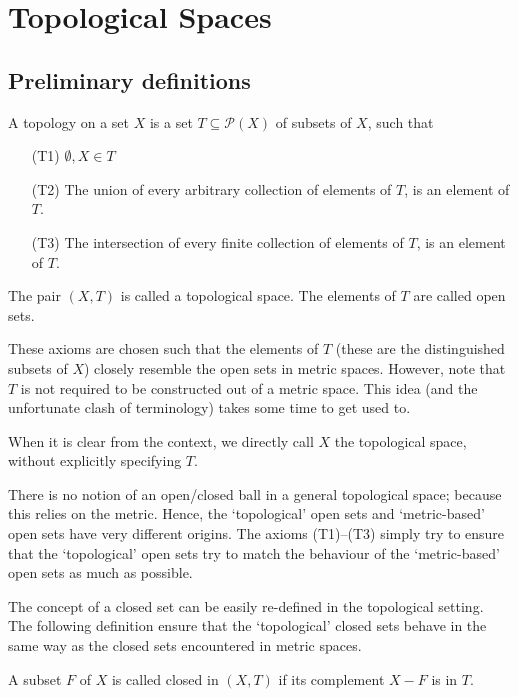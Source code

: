 \section{Topological Spaces}

\subsection{Preliminary definitions}
\begin{ndfn}
  A topology on a set $X$ is a set $T \subseteq \mathcal{P}(X)$ of subsets of $X$, such that
  \begin{enumerate}[leftmargin=15mm]
  \item[(T1)] $\emptyset, X \in T$
  \item[(T2)] The union of every arbitrary collection of elements of $T$, is an element of $T$.
  \item[(T3)] The intersection of every finite collection of elements of $T$, is an element of $T$.
  \end{enumerate}
  The pair $(X,T)$ is called a topological space. The elements of $T$ are called open sets.
\end{ndfn}

These axioms are chosen such that the elements of $T$ (these are the distinguished subsets of $X$) closely resemble the open sets in metric spaces. However, note that $T$ is not required to be constructed out of a metric space. This idea (and the unfortunate clash of terminology) takes some time to get used to.

\begin{remark}
  When it is clear from the context, we directly call $X$ the topological space, without explicitly specifying $T$.
\end{remark}

\begin{remark}
  There is no notion of an open/closed ball in a general topological space; because this relies on the metric. Hence, the `topological' open sets and `metric-based' open sets have very different origins. The axioms (T1)--(T3) simply try to ensure that the `topological' open sets try to match the behaviour of the `metric-based' open sets as much as possible.
\end{remark}

The concept of a closed set can be easily re-defined in the topological setting. The following definition ensure that the `topological' closed sets behave in the same way as the closed sets encountered in metric spaces.
\begin{ndfn}
  A subset $F$ of $X$ is called closed in $(X,T)$ if its complement $X-F$ is in $T$.
\end{ndfn}

